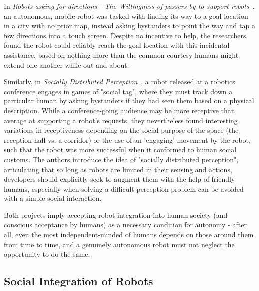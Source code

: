 \documentclass{sfuthesis}
\begin{document}
In \textit{Robots asking for directions - The Willingness of passers-by to support robots}~\cite{weiss2010robots}, an autonomous, mobile robot was tasked with finding its way to a goal location in a city with no prior map, instead asking bystanders to point the way and tap a few directions into a touch screen. Despite no incentive to help, the researchers found the robot could reliably reach the goal location with this incidental assistance, based on nothing more than the common courtesy humans might extend one another while out and about.

Similarly, in \textit{Socially Distributed Perception}~\cite{michalowski2006socially}, a robot released at a robotics conference engages in games of "social tag", where they must track down a particular human by asking bystanders if they had seen them based on a physical description. While a conference-going audience may be more receptive than average at supporting a robot's requests, they nevertheless found interesting variations in receptiveness depending on the social purpose of the space (the reception hall vs. a corridor) or the use of an 'engaging' movement by the robot, such that the robot was more successful when it conformed to human social customs. The authors introduce the idea of "socially distributed perception", articulating that so long as robots are limited in their sensing and actions, developers should explicitly seek to augment them with the help of friendly humans, especially when solving a difficult perception problem can be avoided with a simple social interaction. 

Both projects imply accepting robot integration into human society (and conscious acceptance by humans) as a necessary condition for autonomy - after all, even the most independent-minded of humans depends on those around them from time to time, and a genuinely autonomous robot must not neglect the opportunity to do the same.




\subsection{Social Integration of Robots}
\end{document}
